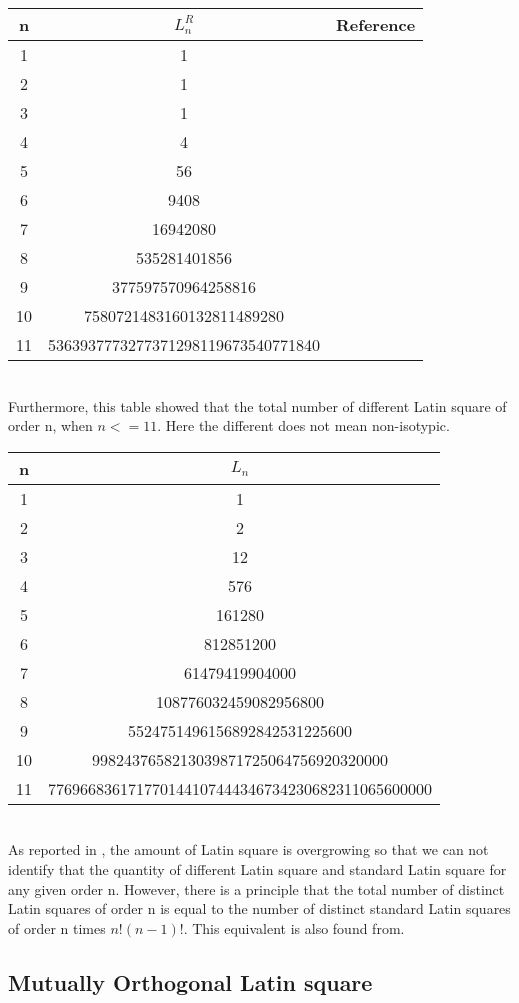\documentclass[12pt]{article}
\begin{document}
\begin{tabular}{|c|c|c|}
\hline
n & $L_n ^ {R}$& Reference\\
\hline
1&1&\\
2&1&\\
3&1&\\
4&4&\\
5&56&\\
6&9408&\cite{ref3}\\
7&16942080&\cite{ref4}\\
8&535281401856&\cite{ref5}\\
9&377597570964258816&\cite{ref6}\\
10&7580721483160132811489280&\cite{ref7}\\
11&5363937773277371298119673540771840&\cite{ref8}\\
\hline
\end{tabular}
\\


Furthermore, this table showed that the total number of different Latin square of order n, when $n <= 11$. Here the different does not mean non-isotypic.


\begin{tabular}{|c|c|}
\hline
n & $L_n$\\
\hline
1&1\\
2&2\\
3&12\\
4&576\\
5&161280\\
6&812851200\\
7&61479419904000\\
8&108776032459082956800\\
9&5524751496156892842531225600\\
10&9982437658213039871725064756920320000\\
11&776966836171770144107444346734230682311065600000\\
\hline
\end{tabular} \\

As reported in \cite{ref1}, the amount of Latin square is overgrowing so that we can not identify that the quantity of different Latin square and standard Latin square for any given order n. However, there is a principle that the total number of distinct Latin squares of order n is equal to the number of distinct standard Latin squares of order n times $n! (n - 1)!$. This equivalent is also found from\cite{ref2}.

\subsection{Mutually Orthogonal Latin square}
\end{document}
